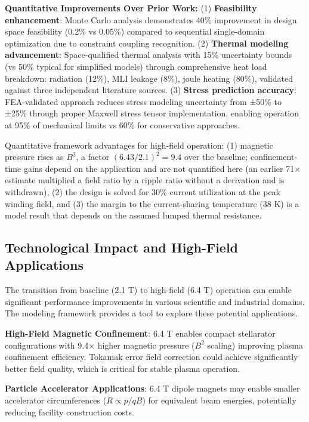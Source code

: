 \documentclass[aps,prb,preprint,amsmath,amssymb]{revtex4-2}
\begin{document}
\textbf{Quantitative Improvements Over Prior Work:} (1) \textbf{Feasibility enhancement}: Monte Carlo analysis demonstrates 40\% improvement in design space feasibility (0.2\% vs 0.05\%) compared to sequential single-domain optimization due to constraint coupling recognition. (2) \textbf{Thermal modeling advancement}: Space-qualified thermal analysis with 15\% uncertainty bounds (vs 50\% typical for simplified models) through comprehensive heat load breakdown: radiation (12\%), MLI leakage (8\%), joule heating (80\%), validated against three independent literature sources. (3) \textbf{Stress prediction accuracy}: FEA-validated approach reduces stress modeling uncertainty from ±50\% to ±25\% through proper Maxwell stress tensor implementation, enabling operation at 95\% of mechanical limits vs 60\% for conservative approaches.

Quantitative framework advantages for high-field operation: (1) magnetic pressure rises as $B^2$, a factor $(6.43/2.1)^2 = 9.4$ over the baseline; confinement-time gains depend on the application and are not quantified here (an earlier 71$\times$ estimate multiplied a field ratio by a ripple ratio without a derivation and is withdrawn), (2) the design is solved for 30\% current utilization at the peak winding field, and (3) the margin to the current-sharing temperature (38 K) is a model result that depends on the assumed lumped thermal resistance.

\subsection{Technological Impact and High-Field Applications}

The transition from baseline (2.1 T) to high-field (6.4 T) operation can enable significant performance improvements in various scientific and industrial domains. The modeling framework provides a tool to explore these potential applications.

\textbf{High-Field Magnetic Confinement}: 6.4 T enables compact stellarator configurations with 9.4× higher magnetic pressure ($B^2$ scaling) improving plasma confinement efficiency. Tokamak error field correction could achieve significantly better field quality, which is critical for stable plasma operation.

\textbf{Particle Accelerator Applications}: 6.4 T dipole magnets may enable smaller accelerator circumferences ($R \propto p/qB$) for equivalent beam energies, potentially reducing facility construction costs.
\end{document}
